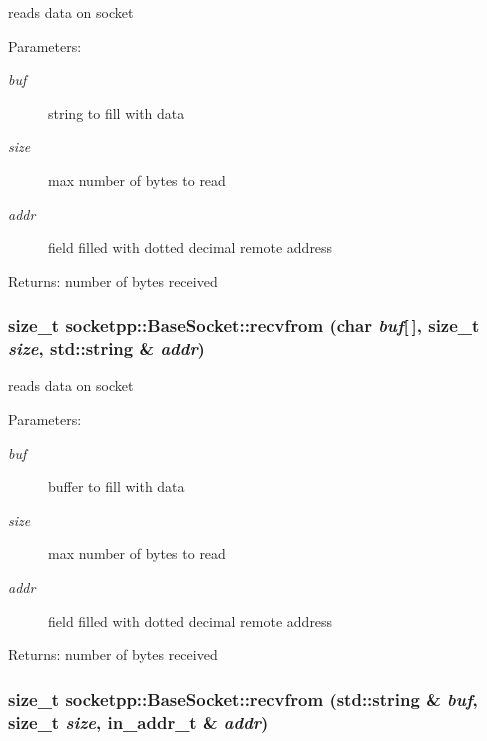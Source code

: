 \begin{CompactItemize}
reads data on socket 

\begin{Desc}
\item[Parameters:]
\begin{description}
\item[{\em buf}]string to fill with data \item[{\em size}]max number of bytes to read \item[{\em addr}]field filled with dotted decimal remote address \end{description}
\end{Desc}
\begin{Desc}
\item[Returns:]number of bytes received \end{Desc}
\hypertarget{classsocketpp_1_1BaseSocket_c7a79cd90b082806dcafb14fbbd130b8}{
\subsubsection[{recvfrom}]{\setlength{\rightskip}{0pt plus 5cm}size\_\-t socketpp::BaseSocket::recvfrom (char {\em buf}\mbox{[}$\,$\mbox{]}, \/  size\_\-t {\em size}, \/  std::string \& {\em addr})}}
\label{classsocketpp_1_1BaseSocket_c7a79cd90b082806dcafb14fbbd130b8}


reads data on socket 

\begin{Desc}
\item[Parameters:]
\begin{description}
\item[{\em buf}]buffer to fill with data \item[{\em size}]max number of bytes to read \item[{\em addr}]field filled with dotted decimal remote address \end{description}
\end{Desc}
\begin{Desc}
\item[Returns:]number of bytes received \end{Desc}
\hypertarget{classsocketpp_1_1BaseSocket_8224b8434da862a72b774a3c80006fcb}{
\subsubsection[{recvfrom}]{\setlength{\rightskip}{0pt plus 5cm}size\_\-t socketpp::BaseSocket::recvfrom (std::string \& {\em buf}, \/  size\_\-t {\em size}, \/  in\_\-addr\_\-t \& {\em addr})}}
\label{classsocketpp_1_1BaseSocket_8224b8434da862a72b774a3c80006fcb}



\end{CompactItemize}

